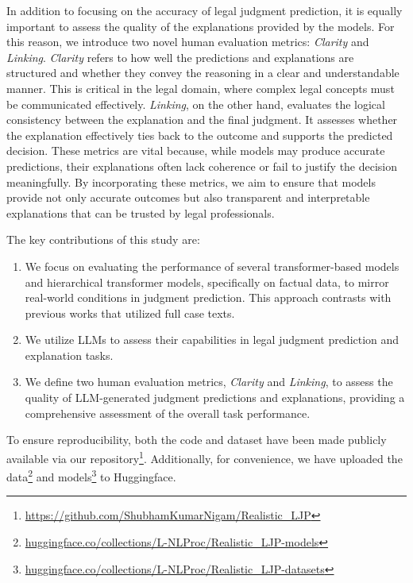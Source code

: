 In addition to focusing on the accuracy of legal judgment prediction, it is equally important to assess the quality of the explanations provided by the models. For this reason, we introduce two novel human evaluation metrics: \textit{Clarity} and \textit{Linking}. \textit{Clarity} refers to how well the predictions and explanations are structured and whether they convey the reasoning in a clear and understandable manner. This is critical in the legal domain, where complex legal concepts must be communicated effectively. \textit{Linking}, on the other hand, evaluates the logical consistency between the explanation and the final judgment. It assesses whether the explanation effectively ties back to the outcome and supports the predicted decision. These metrics are vital because, while models may produce accurate predictions, their explanations often lack coherence or fail to justify the decision meaningfully. By incorporating these metrics, we aim to ensure that models provide not only accurate outcomes but also transparent and interpretable explanations that can be trusted by legal professionals.


The key contributions of this study are:
\begin{enumerate}
    \item We focus on evaluating the performance of several transformer-based models and hierarchical transformer models, specifically on factual data, to mirror real-world conditions in judgment prediction. This approach contrasts with previous works that utilized full case texts.
    \item We utilize LLMs to assess their capabilities in legal judgment prediction and explanation tasks.
    \item We define two human evaluation metrics, \textit{Clarity} and \textit{Linking}, to assess the quality of LLM-generated judgment predictions and explanations, providing a comprehensive assessment of the overall task performance.
\end{enumerate}
To ensure reproducibility, both the code and dataset have been made publicly available via our repository\footnote{\href{https://github.com/ShubhamKumarNigam/Realistic_LJP}{https://github.com/ShubhamKumarNigam/Realistic\_LJP}}. Additionally, for convenience, we have uploaded the data\footnote{\href{https://huggingface.co/collections/L-NLProc/realistic-ljp-models-670ccbb2b390830b3989f6bf}{huggingface.co/collections/L-NLProc/Realistic\_LJP-models}} and models\footnote{\href{https://huggingface.co/collections/L-NLProc/realistic-ljp-datasets-670ccbeab5aea07a37e86df8}{huggingface.co/collections/L-NLProc/Realistic\_LJP-datasets}} to Huggingface.
